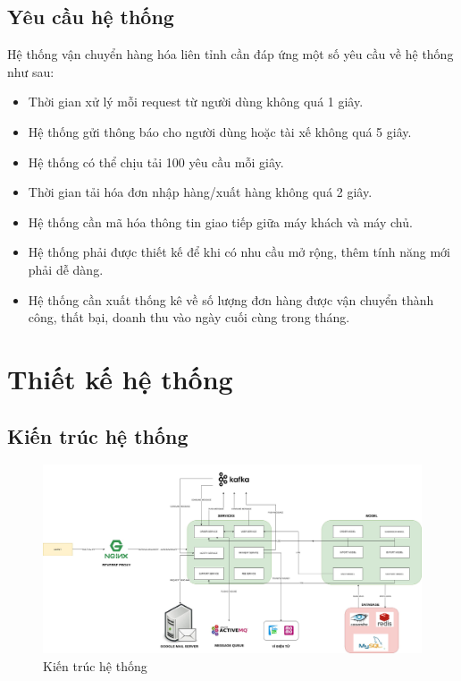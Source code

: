     \subsection{Yêu cầu hệ thống}
    Hệ thống vận chuyển hàng hóa liên tỉnh cần đáp ứng một số yêu cầu về hệ thống như sau:
        \begin{itemize}
            \item Thời gian xử lý mỗi request từ người dùng không quá 1 giây.
            \item Hệ thống gửi thông báo cho người dùng hoặc tài xế  không quá 5 giây.
            \item Hệ thống có thể chịu tải 100 yêu cầu mỗi giây.
            \item Thời gian tải hóa đơn nhập hàng/xuất hàng không quá 2 giây.
            \item Hệ thống cần mã hóa thông tin giao tiếp giữa máy khách và máy chủ.
            \item Hệ thống phải được thiết kế để khi có nhu cầu mở rộng, thêm tính năng mới phải dễ dàng.
            \item Hệ thống cần xuất thống kê về số lượng đơn hàng được vận chuyển thành công, thất bại, doanh thu vào ngày cuối cùng trong tháng.
        \end{itemize}
    
    \newpage

\section{Thiết kế hệ thống}

\subsection{Kiến trúc hệ thống}
	
		\begin{figure}[H]
			\includegraphics[width=1\textwidth]{Images/SystemArchitecture.jpg}
			\centering
			\linebreak
			\caption{Kiến trúc hệ thống}
		\end{figure}
	

